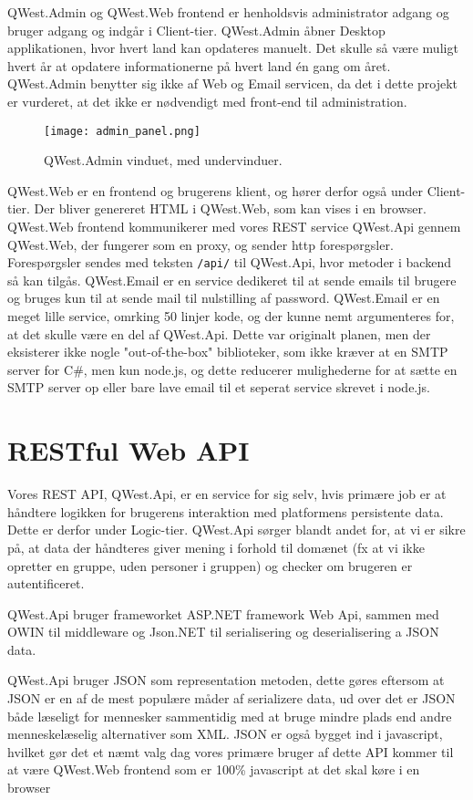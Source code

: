 QWest.Admin og QWest.Web frontend er henholdsvis administrator adgang og bruger adgang og indgår i Client-tier. QWest.Admin åbner Desktop applikationen, hvor hvert land kan opdateres manuelt. Det skulle så være muligt hvert år at opdatere informationerne på hvert land én gang om året. QWest.Admin benytter sig ikke af Web og Email servicen, da det i dette projekt er vurderet, at det ikke er nødvendigt med front-end til administration. 

\begin{figure}
    \texttt{[image: admin\_panel.png]}
    \caption{QWest.Admin vinduet, med undervinduer.}
    \label{fig:admin_panel}
\end{figure}

QWest.Web er en frontend og brugerens klient, og hører derfor også under Client-tier. Der bliver genereret HTML i QWest.Web, som kan vises i en browser. QWest.Web frontend kommunikerer med vores REST service QWest.Api gennem QWest.Web, der fungerer som en proxy, og sender http forespørgsler. Forespørgsler sendes med teksten \texttt{/api/} til QWest.Api, hvor metoder i backend så kan tilgås. QWest.Email er en service dedikeret til at sende emails til brugere og bruges kun til at sende mail til nulstilling af password. QWest.Email er en meget lille service, omrking 50 linjer kode, og der kunne nemt argumenteres for, at det skulle være en del af QWest.Api. Dette var originalt planen, men der eksisterer ikke nogle "out-of-the-box" biblioteker, som ikke kræver at en SMTP server for C\#, men kun node.js, og dette reducerer mulighederne for at sætte en SMTP server op eller bare lave email til et seperat service skrevet i node.js.


\section{RESTful Web API}\label{sec:REST}
Vores REST API, QWest.Api, er en service for sig selv, hvis primære job er at håndtere logikken for brugerens interaktion med platformens persistente data. Dette er derfor under Logic-tier. QWest.Api sørger blandt andet for, at vi er sikre på, at data der håndteres giver mening i forhold til domænet (fx at vi ikke opretter en gruppe, uden personer i gruppen) og checker om brugeren er autentificeret.

QWest.Api bruger frameworket ASP.NET framework Web Api, sammen med OWIN\cite{Owin} til middleware og Json.NET til serialisering og deserialisering a JSON data.

QWest.Api bruger JSON\cite{json} som representation metoden, dette gøres eftersom at JSON er en af de mest populære måder af serializere data, ud over det er JSON både læseligt for mennesker sammentidig med at bruge mindre plads end andre menneskelæselig alternativer som XML. JSON er også bygget ind i javascript, hvilket gør det et næmt valg dag vores primære bruger af dette API kommer til at være QWest.Web frontend som er 100\% javascript at det skal køre i en browser

